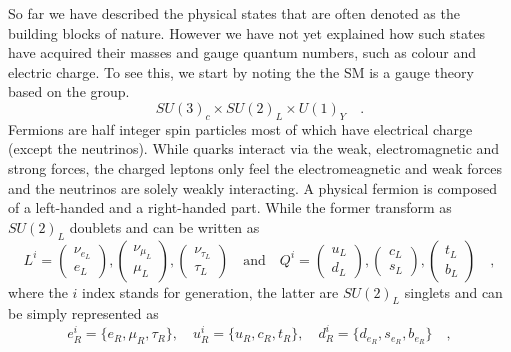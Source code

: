 \documentclass[12pt]{article}
\begin{document}
 
So far we have described the physical states that are often denoted as the building blocks of nature. However we have not yet explained how such states have acquired their masses and gauge quantum numbers, such as colour and electric charge. To see this, we start by noting the the SM is a gauge theory based on the group.
%
\begin{equation}
SU(3)_c \times SU(2)_L \times U(1)_Y \quad  .
\label{SMsymmetry}
\end{equation} 
%
Fermions are half integer spin particles most of which have electrical charge (except the neutrinos).  While quarks interact via the weak, electromagnetic and strong forces, the charged leptons only feel the electromeagnetic and weak forces and the neutrinos are solely weakly interacting.  
%
A physical fermion is composed of a left-handed and a right-handed part. While the former transform as $SU(2)_L$ doublets and can be written as
%
\begin{equation}
L^i= \begin{pmatrix}
\nu_{e_L} \\
e_L 
\end{pmatrix},\begin{pmatrix}
\nu_{\mu_L} \\
\mu_L 
\end{pmatrix}
,\begin{pmatrix}
\nu_{\tau_L} \\
\tau_L 
\end{pmatrix} \quad \text{and} \quad Q^i= \begin{pmatrix}
u_{L} \\
d_L 
\end{pmatrix},\begin{pmatrix}
c_{L} \\
s_L 
\end{pmatrix}
,\begin{pmatrix}
t_{L} \\
b_L 
\end{pmatrix} \quad ,
\end{equation}
%
where the $i$ index stands for generation, the latter are $SU(2)_L$ singlets and can be simply represented as
%
 \begin{equation}
e^i_R=\{e_R,\mu_R,\tau_R\}, \quad  u^i_R=\{u_R,c_R,t_R\}, \quad d^i_R=\{d_{e_R},s_{e_R},b_{e_R}\} \quad , 
\end{equation}
\end{document}
